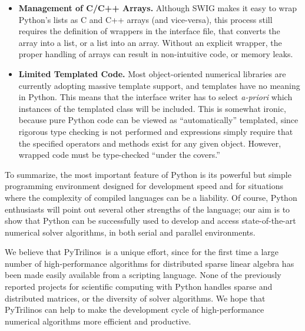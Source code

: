 \documentclass[acmtocl]{acmtrans2m}
\newcommand{\PyTrilinos}{{PyTrilinos}}
\begin{document}
\begin{itemize}
\item {\bf Management of C/C++ Arrays.} Although SWIG makes it easy to
  wrap Python's lists as C and C++ arrays (and vice-versa), this
  process still requires the definition of wrappers in the interface
  file, that converts the array into a list, or a list into an
  array. Without an explicit wrapper, the proper handling of arrays
  can result in non-intuitive code, or memory leaks.

\item {\bf Limited Templated Code.} Most object-oriented numerical
  libraries are currently adopting massive template support, and
  templates have no meaning in Python.  This means that the interface
  writer has to select {\sl a-priori} which instances of the templated
  class will be included.  This is somewhat ironic, because pure
  Python code can be viewed as ``automatically'' templated, since
  rigorous type checking is not performed and expressions simply
  require that the specified operators and methods exist for any given
  object.  However, wrapped code must be type-checked ``under the
  covers.''

\end{itemize}

\smallskip

To summarize, the most important feature of Python is its powerful but
simple programming environment designed for development speed and for
situations where the complexity of compiled languages can be a
liability. Of course, Python enthusiasts will point out several other
strengths of the language; our aim is to show that Python can be
successfully used to develop and access state-of-the-art numerical
solver algorithms, in both serial and parallel environments.

We believe that \PyTrilinos\ is a unique effort, since for the first
time a large number of high-performance algorithms for distributed
sparse linear algebra has been made easily available from a scripting
language.  None of the previously reported projects for scientific
computing with Python handles sparse and distributed matrices, or the
diversity of solver algorithms. We hope that PyTrilinos can help to
make the development cycle of high-performance numerical algorithms
more efficient and productive.



\end{document}
